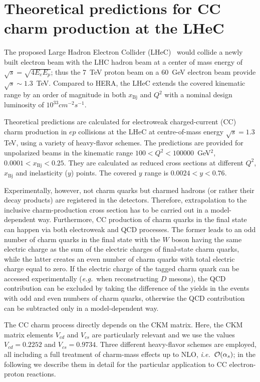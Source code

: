 \documentclass[pdftex,twocolumn,epjc3]{svjour3}          %
\newcommand{\xbj}{\ensuremath{x_{\text{Bj}}}\xspace}
\begin{document}
\goodbreak
%
%
\section{Theoretical predictions for CC charm production at the LHeC} \label{sec:thpred}

The proposed Large Hadron Electron Collider
(LHeC)~\cite{AbelleiraFernandez:2012cc} would collide a newly built
electron beam with the LHC hadron beam at a center of mass energy of
$\sqrt{s} = \sqrt{4 E_e E_p}$; thus the 7~TeV proton beam on a 60~GeV
electron beam provide $\sqrt{s}\sim 1.3$~TeV.
%
Compared to HERA, the LHeC extends the covered kinematic range by an
order of magnitude in both \xbj and $Q^2$ with a nominal design
luminosity of $10^{33} cm^{-2} s^{-1}$.

%

Theoretical predictions are calculated for electroweak charged-current
(CC) charm production in $ep$ collisions at the LHeC at centre-of-mass
energy $\sqrt{s} = 1.3$ TeV, using a variety of heavy-flavor
schemes. The predictions are provided for unpolarized beams in the
kinematic range $100 < Q^2 < 100000$~GeV$^2$, $0.0001 < \xbj < 0.25$.
They are calculated as reduced cross sections at different $Q^2$, \xbj
and inelasticity ($y$) points. 
The covered $y$ range is $0.0024 < y < 0.76$.

Experimentally, however, not charm quarks but charmed hadrons (or
rather their decay products) are registered in the detectors.
Therefore, extrapolation to the inclusive charm-production cross
section has to be carried out in a model-dependent way. Furthermore,
CC production of charm quarks in the final state can happen via both
electroweak and QCD processes.  The former leads to an odd number of
charm quarks in the final state with the $W$ boson having the same
electric charge as the sum of the electric charges of final-state
charm quarks, while the latter creates an even number of charm quarks
with total electric charge equal to zero. If the electric charge of
the tagged charm quark can be accessed experimentally
(\textit{e.g.}~when reconstructing $D$ mesons), the QCD contribution
can be excluded by taking the difference of the yields in the events
with odd and even numbers of charm quarks, otherwise the QCD
contribution can be subtracted only in a model-dependent way.

The CC charm process directly depends on the CKM matrix. Here, the CKM
matrix elements $V_{cd}$ and $V_{cs}$ are particularly relevant
and we use the values $V_{cd} = 0.2252$ and $V_{cs} = 0.9734$.
Three different heavy-flavor schemes are employed, all including a full
treatment of charm-mass effects up to NLO,
\textit{i.e.}~${\cal O}(\alpha_s)$;
in the following we describe them in detail for the  particular
application to CC electron-proton reactions.
\end{document}
